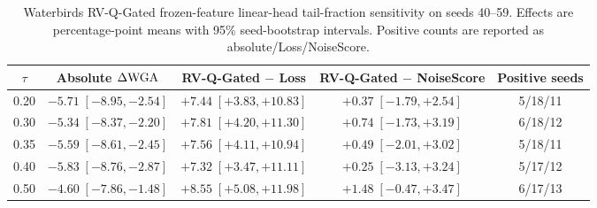 \begin{table}[H]
\caption{Waterbirds RV-Q-Gated frozen-feature linear-head tail-fraction sensitivity on seeds 40--59. Effects are percentage-point means with 95\% seed-bootstrap intervals. Positive counts are reported as absolute/Loss/NoiseScore.}
\label{tab:waterbirds-gated-tau}
\centering
\scriptsize
\setlength{\tabcolsep}{3.0pt}
\begin{tabular}{ccccc}
\toprule
$\tau$ & Absolute $\Delta\mathrm{WGA}$ & RV-Q-Gated $-$ Loss & RV-Q-Gated $-$ NoiseScore & Positive seeds \\
\midrule
0.20 & $-5.71\;[-8.95,-2.54]$ & $+7.44\;[+3.83,+10.83]$ & $+0.37\;[-1.79,+2.54]$ & 5/18/11 \\
0.30 & $-5.34\;[-8.37,-2.20]$ & $+7.81\;[+4.20,+11.30]$ & $+0.74\;[-1.73,+3.19]$ & 6/18/12 \\
0.35 & $-5.59\;[-8.61,-2.45]$ & $+7.56\;[+4.11,+10.94]$ & $+0.49\;[-2.01,+3.02]$ & 5/18/11 \\
0.40 & $-5.83\;[-8.76,-2.87]$ & $+7.32\;[+3.47,+11.11]$ & $+0.25\;[-3.13,+3.24]$ & 5/17/12 \\
0.50 & $-4.60\;[-7.86,-1.48]$ & $+8.55\;[+5.08,+11.98]$ & $+1.48\;[-0.47,+3.47]$ & 6/17/13 \\
\bottomrule
\end{tabular}
\end{table}
